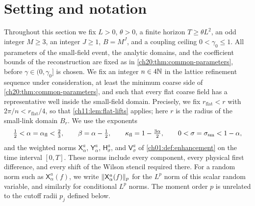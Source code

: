 \section{Setting and notation}\label{ch30:sec:setting}

Throughout this section we fix $L>0$, $\theta>0$, a finite horizon $T\ge\theta L^2$, an odd integer $M\ge3$, an integer $J\ge1$, $B=M^J$, and a coupling ceiling $0<\gamma_0\le1$. All parameters of the small-field event, the analytic domains, and the coefficient bounds of the reconstruction are fixed as in \cref{ch20:thm:common-parameters}, before $\gamma\in(0,\gamma_0]$ is chosen. We fix an integer $n\in4\mathbb N$ in the lattice refinement sequence under consideration, at least the minimum coarse side of \cref{ch20:thm:common-parameters}, and such that every flat coarse field has a representative well inside the small-field domain. Precisely, we fix $r_{\mathrm{flat}}<r$ with $2\pi/n<r_{\mathrm{flat}}/4$, so that \cref{ch11:lem:flat-lifts} applies; here $r$ is the radius of the small-link domain $B_r$. We use the exponents
\[
 \tfrac12<\alpha=\alpha_{\mathrm{fl}}<\tfrac23,\qquad \beta=\alpha-\tfrac12,\qquad \kappa_{\mathrm{fl}}=1-\tfrac{3\alpha}{2},\qquad 0<\sigma=\sigma_{\mathrm{sm}}<1-\alpha,
\]
and the weighted norms $\mathsf X_\alpha^a$, $\mathsf Y_\alpha^a$, $\mathsf H_\sigma^a$, and $\mathsf V_\sigma^a$ of \cref{ch01:def:enhancement} on the time interval $[0,T]$. These norms include every component, every physical first difference, and every shift of the Wilson stencil required there. For a random norm such as $\mathsf X_\alpha^a(f)$, we write $\lVert \mathsf X_\alpha^a(f)\rVert_p$ for the $L^p$ norm of this scalar random variable, and similarly for conditional $L^p$ norms. The moment order $p$ is unrelated to the cutoff radii $p_j$ defined below.

